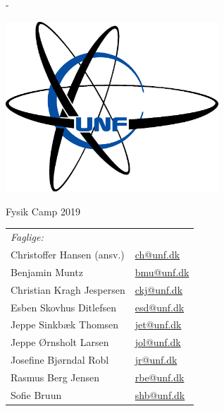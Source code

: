 \begin{titlingpage}
  \newlength{\frontpagecorrection}
  \calccentering{\frontpagecorrection}

  \begin{adjustwidth*}{\frontpagecorrection-2cm}{-\frontpagecorrection-2cm}
    
  \centering

  \vfill

  \includegraphics[width=8cm]{preamble/Unflogo.eps}
 
  \scshape
    
  \fontsize{24pt}{28pt}\selectfont

  \bigskip

  \vspace{0.5cm}
    
  Fysik Camp 2019\par

  \vspace{1cm}
  
  \begin{table}[h!]
    \centering
    \begin{tabular}{ll}
      \textit{Faglige:} & \\
      Christoffer Hansen (ansv.)       & \href{mailto:ch@unf.dk}{ch@unf.dk} \\
      Benjamin Muntz           & \href{mailto:bmu@unf.dk}{bmu@unf.dk} \\
      Christian Kragh Jespersen          & \href{mailto:ckj@unf.dk}{ckj@unf.dk} \\
      Esben Skovhus Ditlefsen           & \href{mailto:esd@unf.dk}{esd@unf.dk} \\
      Jeppe Sinkbæk Thomsen           & \href{mailto:jet@unf.dk}{jet@unf.dk} \\
      Jeppe Ørnsholt Larsen           & \href{mailto:jol@unf.dk}{jol@unf.dk} \\
      Josefine Bjørndal Robl           & \href{mailto:jr@unf.dk}{jr@unf.dk} \\
      Rasmus Berg Jensen           & \href{mailto:rbe@unf.dk}{rbe@unf.dk} \\
      Sofie Bruun         & \href{mailto:shbl@unf.dk}{shb@unf.dk} \\
      

\end{tabular}
\end{table}
\end{adjustwidth*}
\end{titlingpage}

